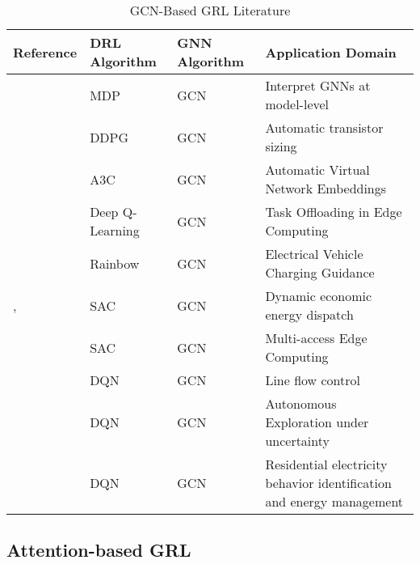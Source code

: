 \begin{table}[H] 
	\centering
	\caption{\acs{GCN}-Based \acs{GRL} Literature}
	\begin{tabular}{|P{2cm}|P{2cm}|P{2cm}|p{5cm}|  }
		\hline
		\textbf{Reference} & \textbf{DRL Algorithm} & \textbf{GNN Algorithm}& \textbf{Application Domain} \\
		\hline
		\cite{yuanXGNNModelLevelExplanations2020} & MDP & GCN & Interpret GNNs at model-level \\ \hline
		\cite{wangGCNRLCircuitDesigner2020} & DDPG & GCN & Automatic transistor sizing \\ \hline
		\cite{yanAutomaticVirtualNetwork2020} & A3C & GCN & Automatic Virtual Network Embeddings \\ \hline
		\cite{tangDependentTaskOffloading2020} & Deep Q-Learning & GCN & Task Offloading in Edge Computing \\ \hline
		\cite{xingGraphReinforcementLearningBased2023} & Rainbow  &  GCN & Electrical Vehicle Charging Guidance \\ \hline
		\cite{liNovelGraphReinforcement2022}, \cite{chenScalableGraphReinforcement2023} & SAC & GCN & Dynamic economic energy dispatch \\ \hline
		\cite{lengGraphConvolutionalNetworkbased2021} & SAC & GCN & Multi-access Edge Computing \\ \hline
		\cite{xuSimulationConstraintGraphReinforcement2020} & DQN & GCN & Line flow control \\ \hline
		\cite{chenAutonomousExplorationUncertainty2020} & DQN & GCN  & Autonomous Exploration under uncertainty \\  \hline
		\cite{chenGraphRepresentationLearningbased2023} & DQN & GCN & Residential electricity behavior identification and energy management \\ \hline
	\end{tabular}
	\label{tab:gcn-lit}
\end{table}




\subsection{Attention-based GRL}

